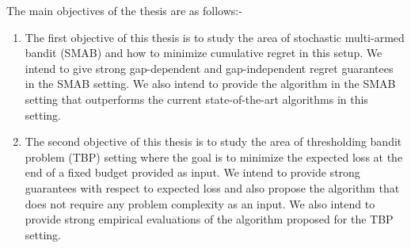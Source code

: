 The main objectives of the thesis are as follows:-
\begin{enumerate}
\item The first objective of this thesis is to study the area of stochastic multi-armed bandit (SMAB) and how to minimize cumulative regret in this setup. We intend to give strong gap-dependent and gap-independent regret guarantees in the SMAB setting. We also intend to provide the algorithm in the SMAB setting that outperforms the current state-of-the-art algorithms in this setting.

\item The second objective of this thesis is to study the area of thresholding bandit problem (TBP) setting where the goal is to minimize the expected loss at the end of a fixed budget provided as input. We intend to provide strong guarantees with respect to expected loss and also propose the algorithm that does not require any problem complexity as an input. We also intend to provide strong empirical evaluations of the algorithm proposed for the TBP setting.

\end{enumerate}